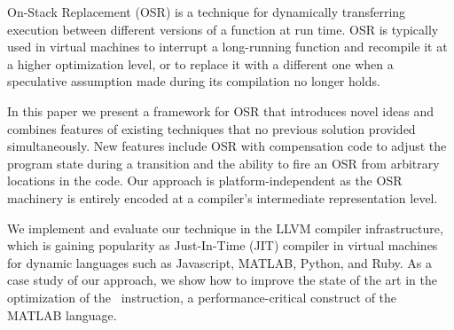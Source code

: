 
On-Stack Replacement (OSR) is a technique for dynamically transferring execution between different versions of a function at run time.
OSR is typically used in virtual machines to interrupt a long-running function and recompile it at a higher optimization level, or to replace it with a different one when a speculative assumption made during its compilation no longer holds.

In this paper we present a framework for OSR that introduces novel ideas and combines features of existing techniques that no previous solution provided simultaneously. New features include OSR with compensation code to adjust the program state during a transition and the ability to fire an OSR from arbitrary locations in the code. Our approach is platform-independent as the OSR machinery is entirely encoded at a compiler's intermediate representation level.



We implement and evaluate our technique in the LLVM compiler infrastructure, which is gaining popularity as Just-In-Time (JIT) compiler in virtual machines for dynamic languages such as Javascript, MATLAB, Python, and Ruby. As a case study of our approach, we show how to improve the state of the art in the optimization of the \feval\ instruction, a performance-critical construct of the MATLAB language.

  
  
  
  
  
  
  
  
  